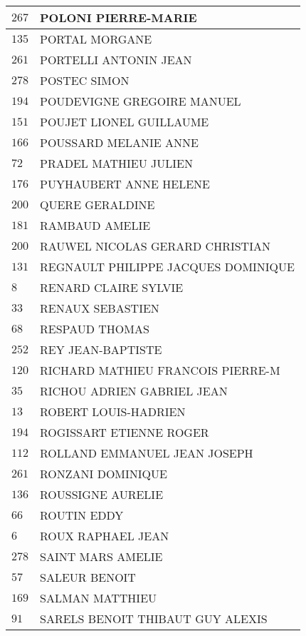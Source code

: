\begin{xltabular}{\linewidth}{|l|X|}
    \hline
    $267$ & POLONI PIERRE-MARIE \\
    \hline
    $135$ & PORTAL MORGANE \\
    \hline
    $261$ & PORTELLI ANTONIN JEAN \\
    \hline
    $278$ & POSTEC SIMON \\
    \hline
    $194$ & POUDEVIGNE GREGOIRE MANUEL \\
    \hline
    $151$ & POUJET LIONEL GUILLAUME \\
    \hline
    $166$ & POUSSARD MELANIE ANNE \\
    \hline
    $72$ & PRADEL MATHIEU JULIEN \\
    \hline
    $176$ & PUYHAUBERT ANNE HELENE \\
    \hline
    $200$ & QUERE GERALDINE \\
    \hline
    $181$ & RAMBAUD AMELIE \\
    \hline
    $200$ & RAUWEL NICOLAS GERARD CHRISTIAN \\
    \hline
    $131$ & REGNAULT PHILIPPE JACQUES DOMINIQUE \\
    \hline
    $8$ & RENARD CLAIRE SYLVIE \\
    \hline
    $33$ & RENAUX SEBASTIEN \\
    \hline
    $68$ & RESPAUD THOMAS \\
    \hline
    $252$ & REY JEAN-BAPTISTE \\
    \hline
    $120$ & RICHARD MATHIEU FRANCOIS PIERRE-M \\
    \hline
    $35$ & RICHOU ADRIEN GABRIEL JEAN \\
    \hline
    $13$ & ROBERT LOUIS-HADRIEN \\
    \hline
    $194$ & ROGISSART ETIENNE ROGER \\
    \hline
    $112$ & ROLLAND EMMANUEL JEAN JOSEPH \\
    \hline
    $261$ & RONZANI DOMINIQUE \\
    \hline
    $136$ & ROUSSIGNE AURELIE \\
    \hline
    $66$ & ROUTIN EDDY \\
    \hline
    $6$ & ROUX RAPHAEL JEAN \\
    \hline
    $278$ & SAINT MARS AMELIE \\
    \hline
    $57$ & SALEUR BENOIT \\
    \hline
    $169$ & SALMAN MATTHIEU \\
    \hline
    $91$ & SARELS BENOIT THIBAUT GUY ALEXIS \\

\end{xltabular}

